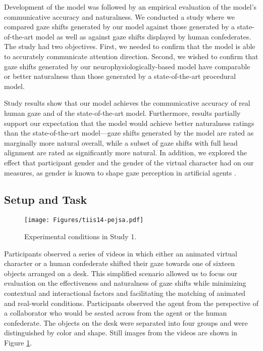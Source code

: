 Development of the model was followed by an empirical evaluation of the model's communicative accuracy and naturalness. We conducted a study where we compared gaze shifts generated by our model against those generated by a state-of-the-art model \cite{peters2010animating} as well as against gaze shifts displayed by human confederates. The study had two objectives. First, we needed to confirm that the model is able to accurately communicate attention direction. Second, we wished to confirm that gaze shifts generated by our neurophysiologically-based model have comparable or better naturalness than those generated by a state-of-the-art procedural model.

Study results show that our model achieves the communicative accuracy of real human gaze and of the state-of-the-art model. Furthermore, results partially support our expectation that the model would achieve better naturalness ratings than the state-of-the-art model---gaze shifts generated by the model are rated as marginally more natural overall, while a subset of gaze shifts with full head alignment are rated as significantly more natural. In addition, we explored the effect that participant gender and the gender of the virtual character had on our measures, as gender is known to shape gaze perception in artificial agents \cite{mutlu2006storytelling}.

\subsection{Setup and Task}

\begin{figure}[t]
  \centering
  \texttt{[image: Figures/tiis14-pejsa.pdf]}
  \caption{Experimental conditions in Study 1.}
  \label{fig:ModelEvalSetup}
\end{figure}

Participants observed a series of videos in which either an animated virtual character or a human confederate shifted their gaze towards one of sixteen objects arranged on a desk. This simplified scenario allowed us to focus our evaluation on the effectiveness and naturalness of gaze shifts while minimizing contextual and interactional factors and facilitating the matching of animated and real-world conditions. Participants observed the agent from the perspective of a collaborator who would be seated across from the agent or the human confederate. The objects on the desk were separated into four groups and were distinguished by color and shape. Still images from the videos are shown in Figure \ref{fig:ModelEvalSetup}.

